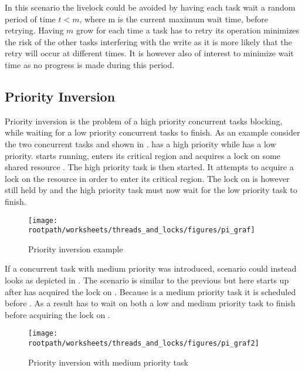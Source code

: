 In this scenario the livelock could be avoided by having each task wait a random period of time $t < m$, where m is the current maximum wait time, before retrying. Having $m$ grow for each time a task has to retry its operation minimizes the risk of the other tasks interfering with the write as it is more likely that the retry will occur at different times. It is however also of interest to minimize wait time as no progress is made during this period.


\subsection{Priority Inversion}
Priority inversion is the problem of a high priority concurrent tasks blocking, while waiting for a low priority concurrent tasks to finish\cite[p. 456]{tanenbaum2008modern}. As an example consider the two concurrent tasks  and  shown in .  has a high priority while  has a low priority.  starts running, enters its critical region and acquires a lock on some shared resource . The high priority task  is then started. It attempts to acquire a lock on the resource  in order to enter its critical region. The lock on  is however still held by  and the high priority task  must now wait for the low priority task  to finish.

\begin{figure}[htbp]
\centering
 \texttt{[image: \\rootpath/worksheets/threads\_and\_locks/figures/pi\_graf]} 
 \caption{Priority inversion example}
\label{fig:priority_inversion}
\end{figure}
If a concurrent task  with medium priority was introduced, scenario could instead looks as depicted in . The scenario is similar to the previous but here  starts up after  has acquired the lock on . Because  is a medium priority task it is scheduled before . As a result  has to wait on both a low and medium priority task to finish before acquiring the lock on .

\begin{figure}[htbp]
\centering
 \texttt{[image: \\rootpath/worksheets/threads\_and\_locks/figures/pi\_graf2]} 
 \caption{Priority inversion with medium priority task}
\label{fig:priority_inversion_m}
\end{figure}

